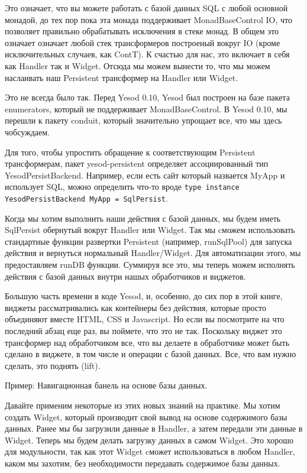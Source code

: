 Это означает, что вы можете работать с базой данных SQL с любой основной монадой, до тех пор пока эта монада поддерживает MonadBaseControl IO, что позволяет правильно обрабатывать исключения в стеке монад. В общем это означает означает любой стек трансформеров построеный вокруг IO (кроме исключительных случаев, как ContT). К счастью для нас, это включает в себя как Handler так и Widget. Отсюда мы можем вынести то, что мы можем наслаивать наш Persistent трансформер на Handler или Widget.

Это не всегда было так. Перед Yesod 0.10, Yesod был построен на базе пакета enumerators, который не поддерживает MonadBaseControl. В Yesod 0.10, мы перешли к пакету conduit, который значительно упрощает все, что мы здесь чобсуждаем.

Для того, чтобы упростить обращение к соответствующим Persistent трансформерам, пакет yesod-persistent определяет ассоциированный тип YesodPersistBackend. Например, если есть сайт который назвается MyApp и использует SQL, можно определить что-то вроде \lstinline'type instance YesodPersistBackend MyApp = SqlPersist'.

Когда мы хотим выполнить наши действия с базой данных, мы будем иметь SqlPersist обернутый вокруг Handler или Widget. Так мы cможем использовать стандартные функции развертки  Persistent (например, runSqlPool) для запуска действия и вернуться нормальный Handler/Widget. Для автоматизации этого, мы предоставляем runDB функции. Суммируя все это, мы теперь можем исполнять действия с базой данных внутри нашых обработчиков и виджетов.

Большую часть времени в коде Yesod, и, особенно, до сих пор в этой книге, виджеты рассматривались как контейнеры без действия, которые просто объединяют вместе HTML, CSS и Javascript. Но если вы посмотрите на что последний абзац еще раз, вы поймете, что это не так. Поскольку виджет это трансформер над обработчиком все, что вы делаете в обработчике может быть сделано в виджете, в том числе и операции с базой данных. Все, что вам нужно сделать, это поднять (lift).

Пример: Навигационная банель на основе базы данных.

Давайте применим некоторые из этих новых знаний на практике. Мы хотим создать Widget, который производит свой вывод на основе содержимого базы данных. Ранее мы бы загрузили данные в Handler, а затем передали эти данные в Widget. Теперь мы будем делать загрузку данных в самом Widget. Это хорошо для модульности, так как этот Widget cможет использоваться в любом Handler, каком мы захотим, без необходимости передавать содержимое базы данных.

